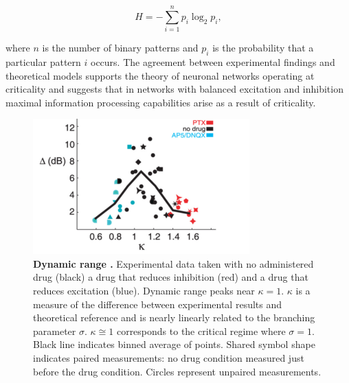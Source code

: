 \documentclass[12pt]{article}
\begin{document}
\begin{equation}
H = - \sum^{n}_{i=1}p_{i}\log_{2}p_{i},
\end{equation}

\noindent where $n$ is the number of binary patterns and $ p_{i} $ is the probability that a particular pattern $i$ occurs. The agreement between experimental findings and theoretical models supports the theory of neuronal networks operating at criticality and suggests that in networks with balanced excitation and inhibition maximal information processing capabilities arise as a result of criticality. 

\begin{figure}      
  \begin{center}    
 \includegraphics[width=.6\textwidth]{dynamicrangeexpplenz}    
    \caption{\textbf{Dynamic range \cite{Shew2009b}.} Experimental data taken with no administered drug (black) a drug that reduces inhibition (red) and a drug that reduces excitation (blue). Dynamic range peaks near $\kappa = 1$. $\kappa$ is a measure of the difference between experimental results and theoretical reference and is nearly linearly related to the branching parameter $\sigma$. $\kappa \cong 1$ corresponds to the critical regime where $\sigma = 1$. Black line indicates binned average of points. Shared symbol shape indicates paired measurements: no drug condition measured just before the drug condition. Circles represent unpaired measurements.}
    
   \label{Figure::Dynamic Range Experiment}   
  \end{center}     
   \end{figure}
  
\end{document}
